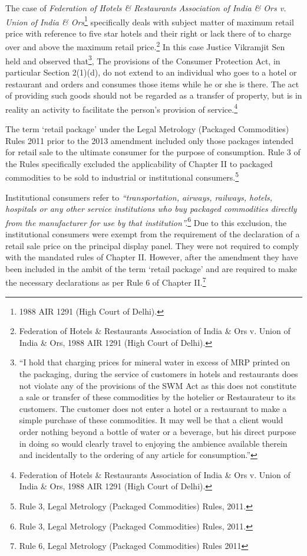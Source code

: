 \begin{multicols}{2}
\noi
The case of \textit{Federation of Hotels \& Restaurants Association of India \& Ors v. Union of India \& Ors}\footnote{1988 AIR 1291 (High Court of Delhi).} specifically deals with subject matter of maximum retail price with reference to five star hotels and their right or lack there of to charge over and above the maximum retail price.\footnote{Federation of Hotels \& Restaurants Association of India \& Ors v. Union of India \& Ors, 1988 AIR 1291 (High Court of Delhi).} In this case Justice Vikramjit Sen held and observed that\footnote{“I hold that charging prices for mineral water in excess of MRP printed on the packaging, during the service of customers in hotels and restaurants does not violate any of the provisions of the SWM Act as this does not constitute a sale or transfer of these commodities by the hotelier or Restaurateur to its customers. The customer does not enter a hotel or a restaurant to make a simple purchase of these commodities. It may well be that a client would order nothing beyond a bottle of water or a beverage, but his direct purpose in doing so would clearly travel to enjoying the ambience available therein and incidentally to the ordering of any article for consumption.”}, The provisions of the Consumer Protection Act, in particular Section 2(1)(d), do not extend to
an individual who goes to a hotel or restaurant and orders and consumes those items while he
or she is there. The act of providing such goods should not be regarded as a transfer of property,
but is in reality an activity to facilitate the person's provision of service.\footnote{Federation of Hotels \& Restaurants Association of India \& Ors v. Union of India \& Ors, 1988 AIR 1291 (High Court of Delhi).}

\vspace{-.15cm}

\noi
The term ‘retail package’ under the Legal Metrology (Packaged Commodities) Rules 2011
prior to the 2013 amendment included only those packages intended for retail sale to the
ultimate consumer for the purpose of consumption. Rule 3 of the Rules specifically excluded
the applicability of Chapter II to packaged commodities to be sold to industrial or institutional
consumers.\footnote{Rule 3, Legal Metrology (Packaged Commodities) Rules, 2011.}

\vspace{-.15cm}

\noi
Institutional consumers refer to \textit{“transportation, airways, railways, hotels, hospitals or any
other service institutions who buy packaged commodities directly from the manufacturer for
use by that institution”.}\footnote{Rule 3, Legal Metrology (Packaged Commodities) Rules, 2011.} Due to this exclusion, the institutional consumers were exempt from the requirement of the declaration of a retail sale price on the principal display panel. They were not required to comply with the mandated rules of Chapter II. However, after the amendment they have been included in the ambit of the term ‘retail package’ and are required to make the necessary declarations as per Rule 6 of Chapter II.\footnote{Rule 6, Legal Metrology (Packaged Commodities) Rules 2011}


\end{multicols}
